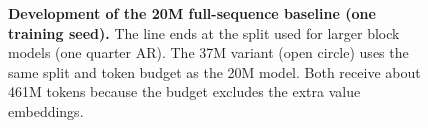 \begin{figure}[t]
\centering

\caption{\textbf{Development of the 20M full-sequence baseline (one training seed).} The line ends at the split used for larger block models (one quarter AR). The 37M variant (open circle) uses the same split and token budget as the 20M model. Both receive about 461M tokens because the budget excludes the extra value embeddings.}
\label{fig:d4-development}
\end{figure}
